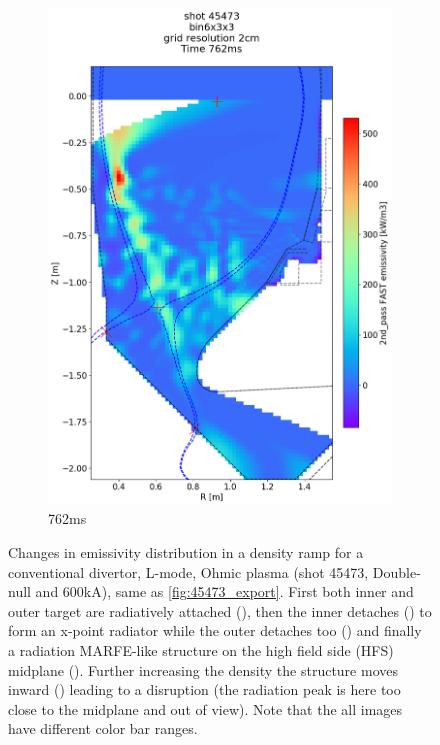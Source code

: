 \begin{figure}
\begin{subfigure}{0.395\linewidth}
         \includegraphics[trim={5 90 0 190},clip,width=\textwidth]{Chapters/chapter2/figs/IRVB-MASTU_shot-45473_export_76.png}
         \vspace*{-6.5mm}
         \caption{762ms}
         \label{fig:45473_export2_5}
     \end{subfigure}
    \vspace*{-3mm}
    \caption{Changes in emissivity distribution in a density ramp for a conventional divertor, L-mode, Ohmic plasma (shot 45473, Double-null and 600kA), same as \autoref{fig:45473_export}. First both inner and outer target are radiatively attached (), then the inner detaches () to form an x-point radiator while the outer detaches too () and finally a radiation MARFE-like structure on the high field side (HFS) midplane (). Further increasing the density the structure moves inward () leading to a disruption (the radiation peak is here too close to the midplane and out of view). Note that the all images have different color bar ranges.}
    \label{fig:45473_export2}
\end{figure}
